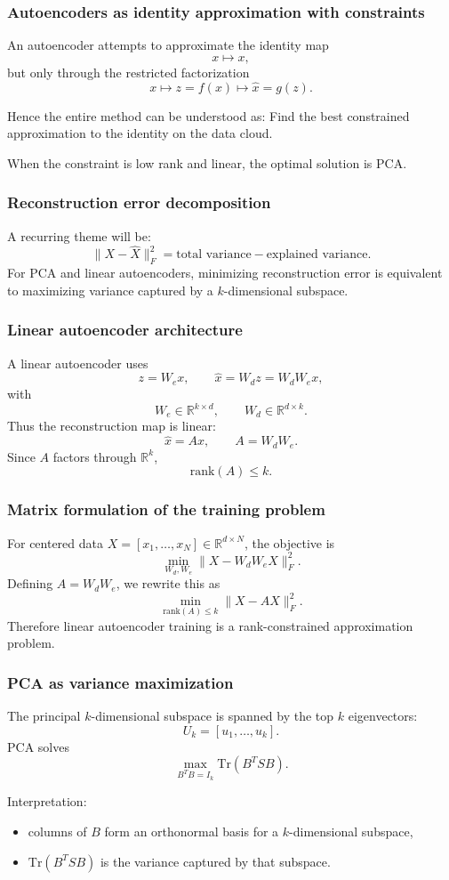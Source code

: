 \documentclass{beamer}
\begin{document}
\begin{frame}
\frametitle{Autoencoders as identity approximation with constraints}

An autoencoder attempts to approximate the identity map
\[
x \mapsto x,
\]
but only through the restricted factorization
\[
x \mapsto z=f(x)\mapsto \hat x=g(z).
\]
\begin{block}{Hence the entire method can be understood as: }
Find the best constrained approximation to the identity on the data cloud.
\end{block}
When the constraint is low rank and linear, the optimal solution is PCA.
\end{frame}

\begin{frame}
\frametitle{Reconstruction error decomposition}

A recurring theme will be:
\[
\|X-\hat X\|_F^2 = \text{total variance} - \text{explained variance}.
\]
For PCA and linear autoencoders, minimizing reconstruction error is equivalent to maximizing variance captured by a \(k\)-dimensional subspace.
\end{frame}

\begin{frame}
\frametitle{Linear autoencoder architecture}

A linear autoencoder uses
\[
z = W_e x,\qquad \hat x = W_d z = W_d W_e x,
\]
with
\[
W_e\in\mathbb{R}^{k\times d},\qquad W_d\in\mathbb{R}^{d\times k}.
\]
Thus the reconstruction map is linear:
\[
\hat x = A x,\qquad A=W_dW_e.
\]
Since \(A\) factors through \(\mathbb{R}^k\),
\[
\mathrm{rank}(A)\le k.
\]
\end{frame}

\begin{frame}
\frametitle{Matrix formulation of the training problem}

For centered data \(X=[x_1,\dots,x_N]\in\mathbb{R}^{d\times N}\), the objective is
\[
\min_{W_d,W_e}\|X-W_dW_eX\|_F^2.
\]
Defining \(A=W_dW_e\), we rewrite this as
\[
\min_{\mathrm{rank}(A)\le k}\|X-AX\|_F^2.
\]
Therefore linear autoencoder training is a rank-constrained approximation problem.
\end{frame}

\begin{frame}
\frametitle{PCA as variance maximization}

The principal \(k\)-dimensional subspace is spanned by the top \(k\) eigenvectors:
\[
U_k = [u_1,\dots,u_k].
\]
PCA solves
\[
\max_{B^TB=I_k}\mathrm{Tr}(B^T S B).
\]
\begin{block}{Interpretation: }
\begin{itemize}
\item columns of \(B\) form an orthonormal basis for a \(k\)-dimensional subspace,

\item \(\mathrm{Tr}(B^TSB)\) is the variance captured by that subspace.
\end{itemize}

\noindent
\end{block}
\end{frame}
\end{document}
